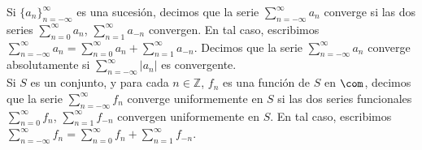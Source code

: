 \begin{obs}
Si $\{a_n\}_{n = -\infty}^{\infty}$ es una sucesión, decimos que la serie $\sum_{n=-\infty}^{\infty} a_n$ converge si las dos series $\sum_{n=0}^{\infty} a_n$, $\sum_{n=1}^{\infty} a_{-n}$ convergen. En tal caso, escribimos $\sum_{n=-\infty}^{\infty} a_n = \sum_{n=0}^{\infty} a_n  +\sum_{n=1}^{\infty} a_{-n}$. Decimos que la serie $\sum_{n=-\infty}^{\infty} a_n$ converge absolutamente si $\sum_{n=-\infty}^{\infty} |a_n|$ es convergente.
\\
\newline
Si $S$ es un conjunto, y para cada $n \in \mathbb{Z}$, $f_n$ es una función de $S$ en $\com$, decimos que la serie $\sum_{n=-\infty}^{\infty} f_n$ converge uniformemente en $S$ si las dos series  funcionales $\sum_{n=0}^{\infty} f_n$, $\sum_{n=1}^{\infty} f_{-n}$ convergen uniformemente en $S$. En tal caso, escribimos $\sum_{n=-\infty}^{\infty} f_n = \sum_{n=0}^{\infty} f_n  +\sum_{n=1}^{\infty} f_{-n}$.
\end{obs}

